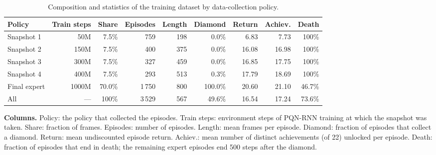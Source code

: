 \begin{table}[H]
\centering
\caption{Composition and statistics of the training dataset by data-collection policy.}
\label{tab:data-train}
\small
\setlength{\tabcolsep}{3.5pt}
\begin{tabular}{lrrrrrrrr}
\toprule
Policy & Train steps & Share & Episodes & Length & Diamond & Return & Achiev. & Death \\
\midrule
Snapshot 1 & 50M & 7.5\% & 759 & 198 & 0.0\% & 6.83 & 7.73 & 100\% \\
Snapshot 2 & 150M & 7.5\% & 400 & 375 & 0.0\% & 16.08 & 16.98 & 100\% \\
Snapshot 3 & 300M & 7.5\% & 327 & 459 & 0.0\% & 16.85 & 17.75 & 100\% \\
Snapshot 4 & 400M & 7.5\% & 293 & 513 & 0.3\% & 17.79 & 18.69 & 100\% \\
Final expert & 1000M & 70.0\% & 1\,750 & 800 & 100.0\% & 20.60 & 21.10 & 46.7\% \\
\midrule
All & --- & 100\% & 3\,529 & 567 & 49.6\% & 16.54 & 17.24 & 73.6\% \\
\bottomrule
\end{tabular}

\vspace{4pt}
\begin{minipage}{\linewidth}
\footnotesize\raggedright
\textbf{Columns.} Policy: the policy that collected the episodes. Train steps: environment steps of PQN-RNN training at which the snapshot was taken. Share: fraction of frames. Episodes: number of episodes. Length: mean frames per episode. Diamond: fraction of episodes that collect a diamond. Return: mean undiscounted episode return. Achiev.: mean number of distinct achievements (of 22) unlocked per episode. Death: fraction of episodes that end in death; the remaining expert episodes end 500 steps after the diamond.
\end{minipage}
\end{table}
